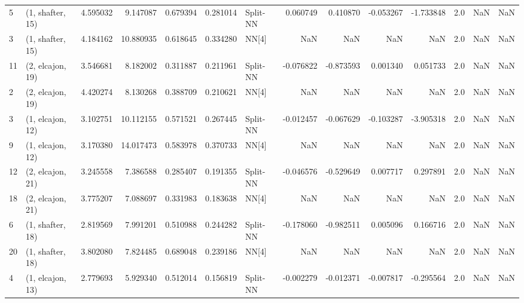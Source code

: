 \begin{tabular}{llrrrrlrrrrrrl}
5  &  (1, shafter, 15) &   4.595032 &   9.147087 &   0.679394 &  0.281014 &    Split-NN &        0.060749 &      0.410870 &      -0.053267 &    -1.733848 &            2.0 &    NaN &              NaN \\
3  &  (1, shafter, 15) &   4.184162 &  10.880935 &   0.618645 &  0.334280 &       NN[4] &             NaN &           NaN &            NaN &          NaN &            2.0 &    NaN &              NaN \\
11 &  (2, elcajon, 19) &   3.546681 &   8.182002 &   0.311887 &  0.211961 &    Split-NN &       -0.076822 &     -0.873593 &       0.001340 &     0.051733 &            2.0 &    NaN &              NaN \\
2  &  (2, elcajon, 19) &   4.420274 &   8.130268 &   0.388709 &  0.210621 &       NN[4] &             NaN &           NaN &            NaN &          NaN &            2.0 &    NaN &              NaN \\
3  &  (1, elcajon, 12) &   3.102751 &  10.112155 &   0.571521 &  0.267445 &    Split-NN &       -0.012457 &     -0.067629 &      -0.103287 &    -3.905318 &            2.0 &    NaN &              NaN \\
9  &  (1, elcajon, 12) &   3.170380 &  14.017473 &   0.583978 &  0.370733 &       NN[4] &             NaN &           NaN &            NaN &          NaN &            2.0 &    NaN &              NaN \\
12 &  (2, elcajon, 21) &   3.245558 &   7.386588 &   0.285407 &  0.191355 &    Split-NN &       -0.046576 &     -0.529649 &       0.007717 &     0.297891 &            2.0 &    NaN &              NaN \\
18 &  (2, elcajon, 21) &   3.775207 &   7.088697 &   0.331983 &  0.183638 &       NN[4] &             NaN &           NaN &            NaN &          NaN &            2.0 &    NaN &              NaN \\
6  &  (1, shafter, 18) &   2.819569 &   7.991201 &   0.510988 &  0.244282 &    Split-NN &       -0.178060 &     -0.982511 &       0.005096 &     0.166716 &            2.0 &    NaN &              NaN \\
20 &  (1, shafter, 18) &   3.802080 &   7.824485 &   0.689048 &  0.239186 &       NN[4] &             NaN &           NaN &            NaN &          NaN &            2.0 &    NaN &              NaN \\
4  &  (1, elcajon, 13) &   2.779693 &   5.929340 &   0.512014 &  0.156819 &    Split-NN &       -0.002279 &     -0.012371 &      -0.007817 &    -0.295564 &            2.0 &    NaN &              NaN \\

\end{tabular}
